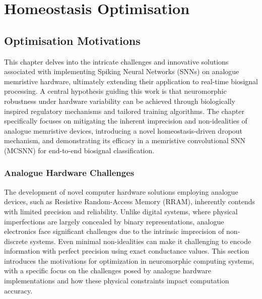 
\chapter{Homeostasis Optimisation}

\section[Optimisation Motivations]{Optimisation Motivations}

This chapter delves into the intricate challenges and innovative solutions associated with implementing Spiking Neural Networks (SNNs) on analogue memristive hardware, ultimately extending their application to real-time biosignal processing. A central hypothesis guiding this work is that neuromorphic robustness under hardware variability can be achieved through biologically inspired regulatory mechanisms and tailored training algorithms. The chapter specifically focuses on mitigating the inherent imprecision and non-idealities of analogue memristive devices, introducing a novel homeostasis-driven dropout mechanism, and demonstrating its efficacy in a memristive convolutional SNN (MCSNN) for end-to-end biosignal classification.

\subsection[Analogue Hardware Challenges]{Analogue Hardware Challenges}

\noindent The development of novel computer hardware solutions employing analogue devices, such as Resistive Random-Access Memory (RRAM), inherently contends with limited precision and reliability. Unlike digital systems, where physical imperfections are largely concealed by binary representations, analogue electronics face significant challenges due to the intrinsic imprecision of non-discrete systems. Even minimal non-idealities can make it challenging to encode information with perfect precision using exact conductance values. This section introduces the motivations for optimization in neuromorphic computing systems, with a specific focus on the challenges posed by analogue hardware implementations and how these physical constraints impact computation accuracy.\\

